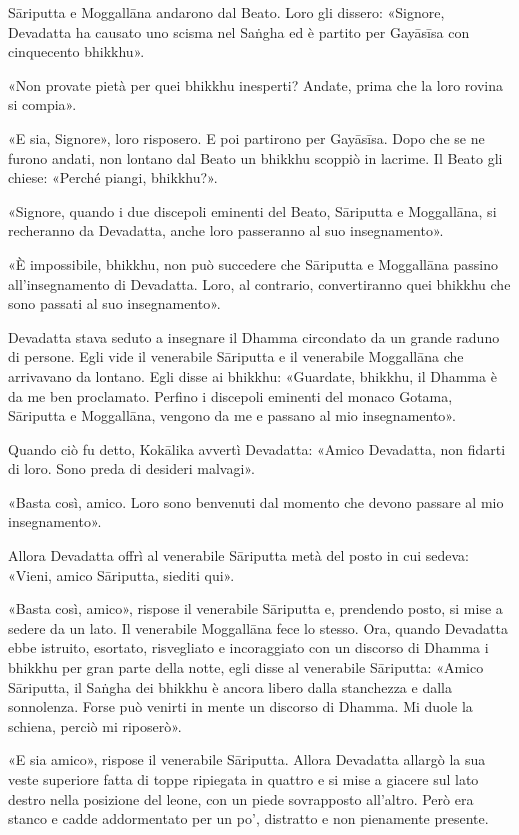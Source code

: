 

 Sāriputta e Moggallāna andarono dal Beato. Loro gli
dissero: «Signore, Devadatta ha causato uno scisma nel Saṅgha ed è
partito per Gayāsīsa con cinquecento bhikkhu».


«Non provate pietà per quei bhikkhu inesperti? Andate, prima che la loro
rovina si compia».


«E sia, Signore», loro risposero. E poi partirono per Gayāsīsa. Dopo che
se ne furono andati, non lontano dal Beato un bhikkhu scoppiò in lacrime. Il
Beato gli chiese: «Perché piangi, bhikkhu?».


«Signore, quando i due discepoli eminenti del Beato, Sāriputta e
Moggallāna, si recheranno da Devadatta, anche loro passeranno al suo
insegnamento».


«È impossibile, bhikkhu, non può succedere che Sāriputta e Moggallāna
passino all’insegnamento di Devadatta. Loro, al contrario, convertiranno
quei bhikkhu che sono passati al suo insegnamento».


Devadatta stava seduto a insegnare il Dhamma circondato da un grande
raduno di persone. Egli vide il venerabile Sāriputta e il venerabile
Moggallāna che arrivavano da lontano. Egli disse ai bhikkhu: «Guardate,
bhikkhu, il Dhamma è da me ben proclamato. Perfino i discepoli eminenti
del monaco Gotama, Sāriputta e Moggallāna, vengono da me e passano al
mio insegnamento».


Quando ciò fu detto, Kokālika avvertì Devadatta: «Amico Devadatta, non
fidarti di loro. Sono preda di desideri malvagi».


«Basta così, amico. Loro sono benvenuti dal momento che devono passare
al mio insegnamento».


Allora Devadatta offrì al venerabile Sāriputta metà del posto in cui
sedeva: «Vieni, amico Sāriputta, siediti qui».


«Basta così, amico», rispose il venerabile Sāriputta e, prendendo posto,
si mise a sedere da un lato. Il venerabile Moggallāna fece lo stesso.
Ora, quando Devadatta ebbe istruito, esortato, risvegliato e
incoraggiato con un discorso di Dhamma i bhikkhu per gran parte della
notte, egli disse al venerabile Sāriputta: «Amico Sāriputta, il Saṅgha
dei bhikkhu è ancora libero dalla stanchezza e dalla sonnolenza. Forse
può venirti in mente un discorso di Dhamma. Mi duole la schiena, perciò
mi riposerò».


«E sia amico», rispose il venerabile Sāriputta. Allora Devadatta allargò
la sua veste superiore fatta di toppe ripiegata in quattro e si mise a
giacere sul lato destro nella posizione del leone, con un piede
sovrapposto all’altro. Però era stanco e cadde addormentato per un po’,
distratto e non pienamente presente.


